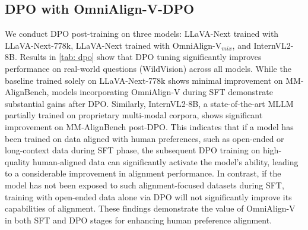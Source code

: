 % 


\subsection{DPO with OmniAlign-V-DPO}
We conduct DPO post-training on three models: 
LLaVA-Next trained with LLaVA-Next-778k, 
LLaVA-Next trained with OmniAlign-V$_{mix}$, 
and InternVL2-8B. 
Results in \cref{tab: dpo} show that DPO tuning significantly improves performance on real-world questions (WildVision) across all models. 
While the baseline trained solely on LLaVA-Next-778k shows minimal improvement on MM-AlignBench, 
models incorporating OmniAlign-V during SFT demonstrate substantial gains after DPO. 
Similarly, InternVL2-8B, a state-of-the-art MLLM partially trained on proprietary multi-modal corpora, shows significant improvement on MM-AlignBench post-DPO. 
This indicates that if a model has been trained on data aligned with human preferences, such as open-ended or long-context data  during SFT phase, the subsequent DPO training on high-quality human-aligned data can significantly activate the model’s ability, leading to a considerable improvement in alignment performance. 
In contrast, if the model has not been exposed to such alignment-focused datasets during SFT, training with open-ended data alone via DPO will not significantly improve its capabilities of alignment.
These findings demonstrate the value of OmniAlign-V in both SFT and DPO stages for enhancing human preference alignment.

